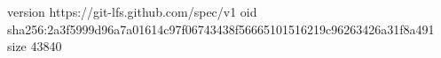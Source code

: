 version https://git-lfs.github.com/spec/v1
oid sha256:2a3f5999d96a7a01614c97f06743438f56665101516219c96263426a31f8a491
size 43840

